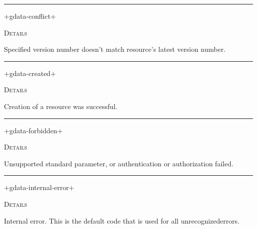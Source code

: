 \documentclass[a4paper]{report}
\begin{document}
  

    \rule{\linewidth}{0.1mm}
    
    \label{cl-gdata-service__variable__+gdata-conflict+}
    \begin{defun}[Variable]
    +gdata-conflict+


	
    \bigskip
    \textsc{Details}

Specified version number doesn't match resource's latest version number.


    
    \end{defun}
  
  

    \rule{\linewidth}{0.1mm}
    
    \label{cl-gdata-service__variable__+gdata-created+}
    \begin{defun}[Variable]
    +gdata-created+


	
    \bigskip
    \textsc{Details}

Creation of a resource was successful.


    
    \end{defun}
  
  

    \rule{\linewidth}{0.1mm}
    
    \label{cl-gdata-service__variable__+gdata-forbidden+}
    \begin{defun}[Variable]
    +gdata-forbidden+


	
    \bigskip
    \textsc{Details}

Unsupported standard parameter, or authentication or authorization failed.


    
    \end{defun}
  
  

    \rule{\linewidth}{0.1mm}
    
    \label{cl-gdata-service__variable__+gdata-internal-error+}
    \begin{defun}[Variable]
    +gdata-internal-error+


	
    \bigskip
    \textsc{Details}

Internal error. This is the default code that is used for all unrecognizederrors.


    
    \end{defun}
  
\end{document}
